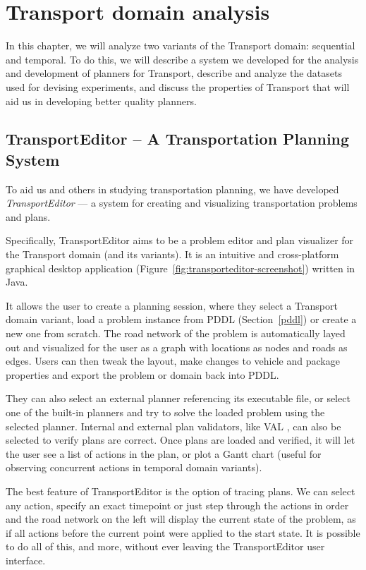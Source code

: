 \chapter{Transport domain analysis}

In this chapter, we will analyze two variants of the Transport domain: sequential and temporal. To do this, we will describe a system we developed for the analysis
and development of planners for Transport, describe and analyze the datasets
used for devising experiments, and discuss the properties of Transport
that will aid us in developing better quality planners.

\section{TransportEditor -- A Transportation Planning System}

To aid us and others in studying transportation planning,
we have developed \textit{TransportEditor} --- a system for creating and visualizing transportation problems and plans.

Specifically, TransportEditor aims to be a problem editor and plan visualizer for the Transport domain (and its variants). It is an intuitive and cross-platform graphical desktop application (Figure~\ref{fig:transporteditor-screenshot})
written in Java.

It allows the user to create a planning session, where they
select a Transport domain variant, load a problem instance from PDDL (Section~\ref{pddl}) or create a new one from scratch.
The road network of the problem is automatically layed out and visualized for the user as a graph with locations as nodes and roads as edges.
Users can then tweak the layout, make changes to vehicle and package properties
and export the problem or domain back into PDDL.

They can also select an external planner
referencing its executable file, or select one of the built-in planners and try to solve
the loaded problem using the selected planner. Internal and external plan validators, like VAL \citep{Howey2003}, can also be selected to verify plans are correct.
Once plans are loaded and verified, it will let the user see a list of actions
in the plan, or plot a Gantt chart (useful for observing concurrent actions in temporal domain variants).

The best feature of TransportEditor is the option of tracing plans. We can select
any action, specify an exact timepoint or just step through the actions in order and
the road network on the left will display the current state of the problem, as if
all actions before the current point were applied to the start state.
It is possible to do all of this, and more, without ever leaving the TransportEditor user interface.

